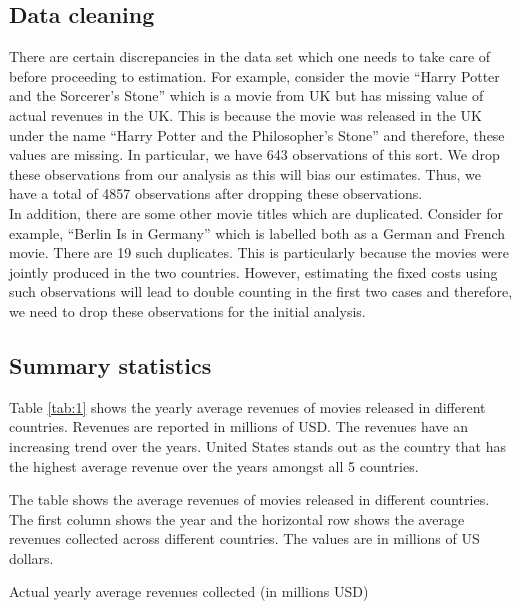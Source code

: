 \documentclass[11pt, letterpaper]{article} \usepackage{amsmath}
\newcommand{\floatintro}[1]{
  
  \vspace*{0.1in}
  
  {\footnotesize

    #1
    
  }
  
  \vspace*{0.1in} } \newcommand{\Hline}{\noindent\rule{18cm}{0.5pt}}
\begin{document}
\subsection{Data cleaning}
There are certain discrepancies in the data set which one needs to
take care of before proceeding to estimation. For example, consider
the movie ``Harry Potter and the Sorcerer's Stone'' which is a movie
from UK but has missing value of actual revenues in the UK. This is
because the movie was released in the UK under the name ``Harry Potter
and the Philosopher's Stone'' and therefore, these values are
missing. In particular, we have 643 observations of this sort. We drop
these observations from our analysis as this will bias our
estimates. Thus, we have a total of 4857 observations after
dropping these observations. \\
In addition, there are some other movie titles which are
duplicated. Consider for example, ``Berlin Is in Germany'' which is
labelled both as a German and French movie. There are 19 such
duplicates. This is particularly because the movies were jointly
produced in the two countries. However, estimating the fixed costs
using such observations will lead to double counting in the first two
cases and therefore, we need to drop these observations for the
initial analysis.
\subsection{Summary statistics}
Table \ref{tab:1} shows the yearly average revenues of movies released
in different countries. Revenues are reported in millions of USD. The
revenues have an increasing trend over the years. United States stands
out as the country that has the highest average revenue over the years
amongst all 5 countries.
\begin{table}[htbp!]
  \floatintro{The table shows the average revenues of movies released
    in different countries. The first column shows the year and the
    horizontal row shows the average revenues collected across
    different countries. The values are in millions of US dollars.}
  \centering
  
  \caption{Actual yearly average revenues collected (in millions USD)}
  \label{tab:1}
\end{table}
\end{document}
